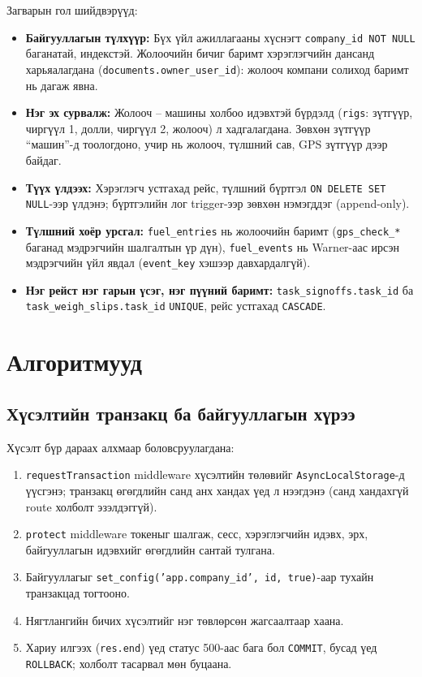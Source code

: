 \documentclass[
12pt,
oneside,
english,
onehalfspacing,
nolistspacing,
headsepline,
]{MUST-Thesis}
\begin{document}
Загварын гол шийдвэрүүд:
\begin{itemize}
    \item \textbf{Байгууллагын түлхүүр:} Бүх үйл ажиллагааны хүснэгт \texttt{company\_id NOT NULL} баганатай, индекстэй. Жолоочийн бичиг баримт хэрэглэгчийн дансанд харьяалагдана (\texttt{documents.owner\_user\_id}): жолооч компани солиход баримт нь дагаж явна.
    \item \textbf{Нэг эх сурвалж:} Жолооч -- машины холбоо идэвхтэй бүрдэлд (\texttt{rigs}: зүтгүүр, чиргүүл 1, долли, чиргүүл 2, жолооч) л хадгалагдана. Зөвхөн зүтгүүр ``машин''-д тоологдоно, учир нь жолооч, түлшний сав, GPS зүтгүүр дээр байдаг.
    \item \textbf{Түүх үлдээх:} Хэрэглэгч устгахад рейс, түлшний бүртгэл \texttt{ON DELETE SET NULL}-ээр үлдэнэ; бүртгэлийн лог trigger-ээр зөвхөн нэмэгддэг (append-only).
    \item \textbf{Түлшний хоёр урсгал:} \texttt{fuel\_entries} нь жолоочийн баримт (\texttt{gps\_check\_*} баганад мэдрэгчийн шалгалтын үр дүн), \texttt{fuel\_events} нь Warner-аас ирсэн мэдрэгчийн үйл явдал (\texttt{event\_key} хэшээр давхардалгүй).
    \item \textbf{Нэг рейст нэг гарын үсэг, нэг пүүний баримт:} \texttt{task\_signoffs.task\_id} ба \texttt{task\_weigh\_slips.task\_id} \texttt{UNIQUE}, рейс устгахад \texttt{CASCADE}.
\end{itemize}

\section{Алгоритмууд}

\subsection{Хүсэлтийн транзакц ба байгууллагын хүрээ}

Хүсэлт бүр дараах алхмаар боловсруулагдана:
\begin{enumerate}
    \item \texttt{requestTransaction} middleware хүсэлтийн төлөвийг \texttt{AsyncLocalStorage}-д үүсгэнэ; транзакц өгөгдлийн санд анх хандах үед л нээгдэнэ (санд хандахгүй route холболт эзэлдэггүй).
    \item \texttt{protect} middleware токеныг шалгаж, сесс, хэрэглэгчийн идэвх, эрх, байгууллагын идэвхийг өгөгдлийн сантай тулгана.
    \item Байгууллагыг \texttt{set\_config('app.company\_id', id, true)}-аар тухайн транзакцад тогтооно.
    \item Нягтлангийн бичих хүсэлтийг нэг төвлөрсөн жагсаалтаар хаана.
    \item Хариу илгээх (\texttt{res.end}) үед статус 500-аас бага бол \texttt{COMMIT}, бусад үед \texttt{ROLLBACK}; холболт тасарвал мөн буцаана.
\end{enumerate}
\end{document}
